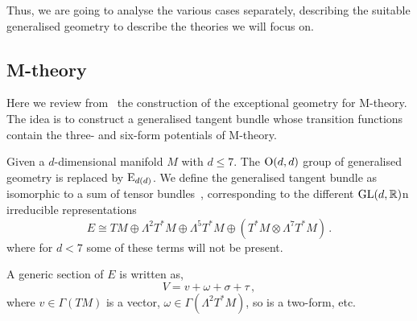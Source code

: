 \documentclass[debug]{phd}
\begin{document}
			Thus, we are going to analyse the various cases separately, describing the suitable generalised geometry to describe the theories we will focus on.
			\subsection{M-theory}\label{sec:MthExcGeom}
				Here we review from~\cite{waldram2} the construction of the exceptional geometry for M-theory. The idea is to construct a generalised tangent bundle
				whose transition functions contain the three- and six-form potentials of M-theory.			%

						Given a $d$-dimensional manifold $M$ with $d \leq 7$. The $\mathrm{O}(d,d)$ group of generalised geometry is replaced by $\mathrm{E}_{d(d)}$. 
						We define the generalised tangent bundle as isomorphic to a sum of tensor bundles~\cite{hull1, waldram5},
						corresponding to the different $\mathrm{GL}(d,\mathbb{R})$n irreducible representations 
								\begin{equation}\label{MthExBun}
									E \cong TM \oplus \Lambda^2 T^*M \oplus \Lambda^5 T^*M \oplus (T^*M \otimes \Lambda^7 T^*M) \, .
								\end{equation}
						where for $d < 7$ some of these terms will not be present.				
						
						A generic section of $E$ is written as,
								\begin{equation}
									V = v + \omega + \sigma + \tau \, ,
								\end{equation}
						where $v \in \Gamma(TM)$ is a vector, $\omega \in \Gamma(\Lambda^2 T^*M)$, so is a two-form, etc.
						
\end{document}
